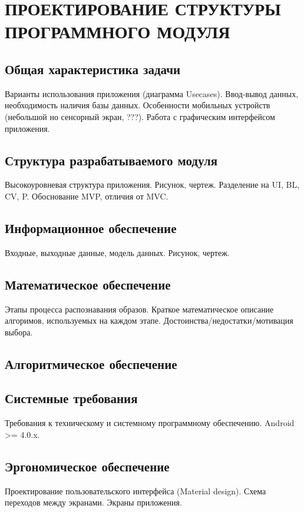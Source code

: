 \section[Проектирование структуры программного модуля]{%
  ПРОЕКТИРОВАНИЕ СТРУКТУРЫ \\ ПРОГРАММНОГО МОДУЛЯ
}\label{sec:design}

\subsection{Общая характеристика задачи}

Варианты использования приложения (диаграмма Usecases).
Ввод-вывод данных, необходимость наличия базы данных.
Особенности мобильных устройств (небольшой но сенсорный экран, ???).
Работа с графическим интерфейсом приложения.

\subsection{Структура разрабатываемого модуля}

Высокоуровневая структура приложения. Рисунок, чертеж.
Разделение на UI, BL, CV, P.
Обоснование MVP, отличия от MVC.

\subsection{Информационное обеспечение}

Входные, выходные данные, модель данных. Рисунок, чертеж.

\subsection{Математическое обеспечение}

Этапы процесса распознавания образов.
Краткое математическое описание алгоримов, используемых на каждом этапе.
Достоинства/недостатки/мотивация выбора.

\subsection{Алгоритмическое обеспечение}


\subsection{Системные требования}

Требования к техническому и системному программному обеспечению.
Android >= 4.0.x.

\subsection{Эргономическое обеспечение}

Проектирование пользовательского интерфейса (Material design).
Схема переходов между экранами. Экраны приложения.
